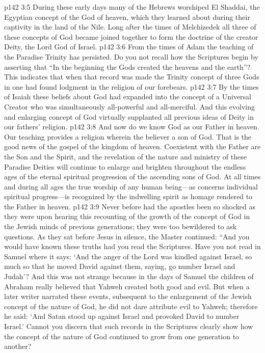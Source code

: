 \pc \vs p142 3:5 \bibnobreakspace {} During these early days many of the Hebrews worshiped El Shaddai, the Egyptian concept of the God of heaven, which they learned about during their captivity in the land of the Nile. Long after the times of Melchizedek all three of these concepts of God became joined together to form the doctrine of the creator Deity, the Lord God of Israel.
\pc \vs p142 3:6 \bibnobreakspace {} From the times of Adam the teaching of the Paradise Trinity has persisted. Do you not recall how the Scriptures begin by asserting that “In the beginning the Gods created the heavens and the earth”? This indicates that when that record was made the Trinity concept of three Gods in one had found lodgment in the religion of our forebears.
\pc \vs p142 3:7 \bibnobreakspace {} By the times of Isaiah these beliefs about God had expanded into the concept of a Universal Creator who was simultaneously all\hyp{}powerful and all\hyp{}merciful. And this evolving and enlarging concept of God virtually supplanted all previous ideas of Deity in our fathers’ religion.
\pc \vs p142 3:8 \bibnobreakspace {} And now do we know God as our Father in heaven. Our teaching provides a religion wherein the believer  a son of God. That is the good news of the gospel of the kingdom of heaven. Coexistent with the Father are the Son and the Spirit, and the revelation of the nature and ministry of these Paradise Deities will continue to enlarge and brighten throughout the endless ages of the eternal spiritual progression of the ascending sons of God. At all times and during all ages the true worship of any human being---as concerns individual spiritual progress---is recognized by the indwelling spirit as homage rendered to the Father in heaven.
\pc \vs p142 3:9 Never before had the apostles been so shocked as they were upon hearing this recounting of the growth of the concept of God in the Jewish minds of previous generations; they were too bewildered to ask questions. As they sat before Jesus in silence, the Master continued: \textcolor{ubdarkred}{“And you would have known these truths had you read the Scriptures. Have you not read in Samuel where it says: ‘And the anger of the Lord was kindled against Israel, so much so that he moved David against them, saying, go number Israel and Judah’? And this was not strange because in the days of Samuel the children of Abraham really believed that Yahweh created both good and evil. But when a later writer narrated these events, subsequent to the enlargement of the Jewish concept of the nature of God, he did not dare attribute evil to Yahweh; therefore he said: ‘And Satan stood up against Israel and provoked David to number Israel.’ Cannot you discern that such records in the Scriptures clearly show how the concept of the nature of God continued to grow from one generation to another?}
